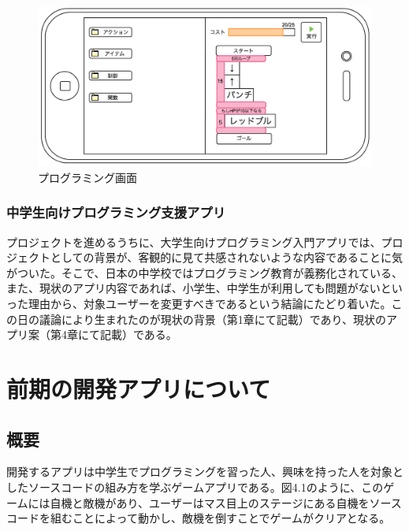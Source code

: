 \documentclass[openany,11pt,papersize]{jsbook}
\begin{document}
\begin{figure}[H]
\begin{center}
\includegraphics[width=12cm, bb=0 0 1173 563]{img/LegendOfN_programming.png}
\end{center}
\caption{プログラミング画面}
\end{figure}
 
 \subsection{中学生向けプログラミング支援アプリ}
\par プロジェクトを進めるうちに、大学生向けプログラミング入門アプリでは、プロジェクトとしての背景が、客観的に見て共感されないような内容であることに気がついた。そこで、日本の中学校ではプログラミング教育が義務化されている、また、現状のアプリ内容であれば、小学生、中学生が利用しても問題がないといった理由から、対象ユーザーを変更すべきであるという結論にたどり着いた。この日の議論により生まれたのが現状の背景（第1章にて記載）であり、現状のアプリ案（第4章にて記載）である。



\chapter{前期の開発アプリについて}
\section{概要}
開発するアプリは中学生でプログラミングを習った人、興味を持った人を対象としたソースコードの組み方を学ぶゲームアプリである。図4.1のように、このゲームには自機と敵機があり、ユーザーはマス目上のステージにある自機をソースコードを組むことによって動かし、敵機を倒すことでゲームがクリアとなる。
\end{document}
